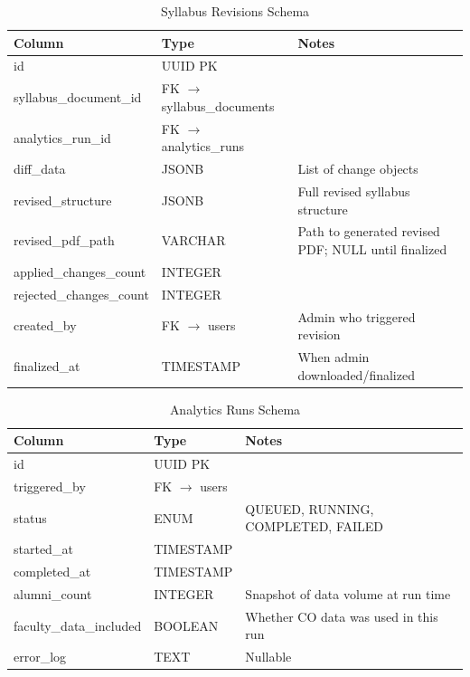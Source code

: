 {\begin{table}[h]
    \centering
    \caption{Syllabus Revisions Schema}
    \begin{tabularx}{\textwidth}{|p{}|p{}|X|}
        \hline
        \textbf{Column} & \textbf{Type} & \textbf{Notes} \\ \hline
        id & UUID PK & \\ \hline
        syllabus\_document\_id & FK $\rightarrow$ syllabus\_documents & \\ \hline
        analytics\_run\_id & FK $\rightarrow$ analytics\_runs & \\ \hline
        diff\_data & JSONB & List of change objects \\ \hline
        revised\_structure & JSONB & Full revised syllabus structure \\ \hline
        revised\_pdf\_path & VARCHAR & Path to generated revised PDF; NULL until finalized \\ \hline
        applied\_changes\_count & INTEGER & \\ \hline
        rejected\_changes\_count & INTEGER & \\ \hline
        created\_by & FK $\rightarrow$ users & Admin who triggered revision \\ \hline
        finalized\_at & TIMESTAMP & When admin downloaded/finalized \\ \hline
    \end{tabularx}
\end{table}

\begin{table}[h]
    \centering
    \caption{Analytics Runs Schema}
    \begin{tabularx}{\textwidth}{|p{}|p{}|X|}
        \hline
        \textbf{Column} & \textbf{Type} & \textbf{Notes} \\ \hline
        id & UUID PK & \\ \hline
        triggered\_by & FK $\rightarrow$ users & \\ \hline
        status & ENUM & QUEUED, RUNNING, COMPLETED, FAILED \\ \hline
        started\_at & TIMESTAMP & \\ \hline
        completed\_at & TIMESTAMP & \\ \hline
        alumni\_count & INTEGER & Snapshot of data volume at run time \\ \hline
        faculty\_data\_included & BOOLEAN & Whether CO data was used in this run \\ \hline
        error\_log & TEXT & Nullable \\ \hline
    \end{tabularx}
\end{table}

} %

